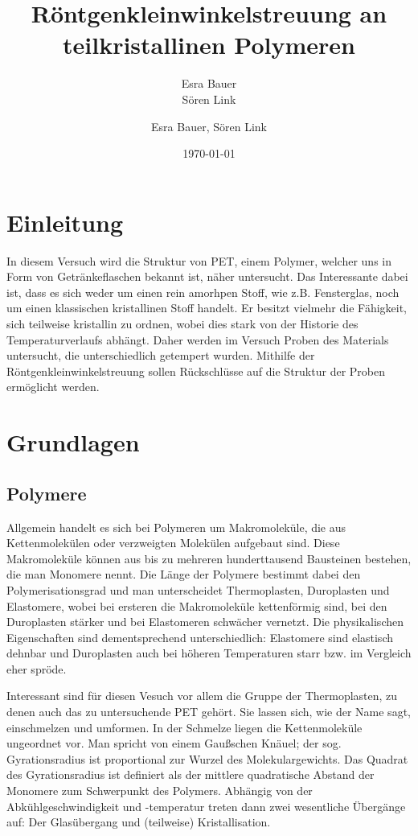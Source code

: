 \documentclass[bigchapter,colorback,accentcolor=tud4b,linedtoc,11pt]{tudreport}
\title{Röntgenkleinwinkelstreuung an teilkristallinen Polymeren}
\subtitle{Esra Bauer  \\Sören Link}
\author{Esra Bauer, Sören Link}
\date{\today}
\begin{document}

\maketitle

\tableofcontents


\chapter{Einleitung}

In diesem Versuch wird die Struktur von PET, einem Polymer, welcher uns in Form von Getränkeflaschen bekannt ist, näher untersucht. Das Interessante dabei ist, dass es sich weder um einen rein amorhpen Stoff, wie z.B. Fensterglas, noch um einen klassischen kristallinen Stoff handelt. Er besitzt vielmehr die Fähigkeit, sich teilweise kristallin zu ordnen, wobei dies stark von der Historie des Temperaturverlaufs abhängt. Daher werden im Versuch Proben des Materials untersucht, die unterschiedlich getempert wurden. Mithilfe der Röntgenkleinwinkelstreuung sollen Rückschlüsse auf die Struktur der Proben ermöglicht werden.

\chapter{Grundlagen}
\section{Polymere}

Allgemein handelt es sich bei Polymeren um Makromoleküle, die aus Kettenmolekülen oder verzweigten Molekülen aufgebaut sind. Diese Makromoleküle können aus bis zu mehreren hunderttausend Bausteinen bestehen, die man Monomere nennt. Die Länge der Polymere bestimmt dabei den Polymerisationsgrad und man unterscheidet Thermoplasten, Duroplasten und Elastomere, wobei bei ersteren die Makromoleküle kettenförmig sind, bei den Duroplasten stärker und bei Elastomeren schwächer vernetzt. Die physikalischen Eigenschaften sind dementsprechend unterschiedlich: Elastomere sind elastisch dehnbar und Duroplasten auch bei höheren Temperaturen starr bzw. im Vergleich eher spröde. 

Interessant sind für diesen Vesuch vor allem die Gruppe der Thermoplasten, zu denen auch das zu untersuchende PET gehört. Sie lassen sich, wie der Name sagt, einschmelzen und umformen. In der Schmelze liegen die Kettenmoleküle ungeordnet vor. Man spricht von einem Gaußschen Knäuel; der sog. Gyrationsradius ist proportional zur Wurzel des Molekulargewichts. Das Quadrat des Gyrationsradius ist definiert als der mittlere quadratische Abstand der Monomere zum Schwerpunkt des Polymers. Abhängig von der Abkühlgeschwindigkeit und -temperatur treten dann zwei wesentliche Übergänge auf: Der Glasübergang und (teilweise) Kristallisation.
\end{document}
